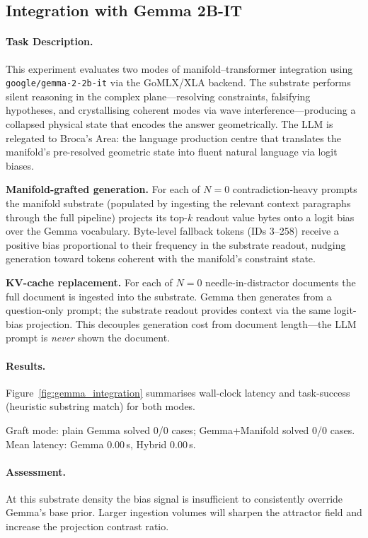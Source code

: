 \subsection{Integration with Gemma 2B-IT}
\label{sec:gemma_integration}

\paragraph{Task Description.}
This experiment evaluates two modes of manifold--transformer integration using
\texttt{google/gemma-2-2b-it} via the GoMLX/XLA backend.  The substrate
performs silent reasoning in the complex plane---resolving constraints,
falsifying hypotheses, and crystallising coherent modes via wave
interference---producing a collapsed physical state that encodes the answer
geometrically.  The LLM is relegated to Broca's Area: the language production
centre that translates the manifold's pre-resolved geometric state into fluent
natural language via logit biases.

\textbf{Manifold-grafted generation.}
For each of $N=0$ contradiction-heavy prompts the manifold substrate
(populated by ingesting the relevant context paragraphs through the full
pipeline) projects its top-$k$ readout value bytes onto a logit bias over the
Gemma vocabulary.  Byte-level fallback tokens (IDs 3--258) receive a positive
bias proportional to their frequency in the substrate readout, nudging
generation toward tokens coherent with the manifold's constraint state.

\textbf{KV-cache replacement.}
For each of $N=0$ needle-in-distractor documents the full document is
ingested into the substrate.  Gemma then generates from a question-only prompt;
the substrate readout provides context via the same logit-bias projection.
This decouples generation cost from document length---the LLM prompt is
\emph{never} shown the document.

\paragraph{Results.}
Figure~\ref{fig:gemma_integration} summarises wall-clock latency and
task-success (heuristic substring match) for both modes.

Graft mode: plain Gemma solved 0/0 cases;
Gemma+Manifold solved 0/0 cases.
Mean latency: Gemma 0.00\,s, Hybrid 0.00\,s.

\paragraph{Assessment.}
At this substrate density the bias signal is insufficient to consistently
override Gemma's base prior.  Larger ingestion volumes will sharpen the
attractor field and increase the projection contrast ratio.
